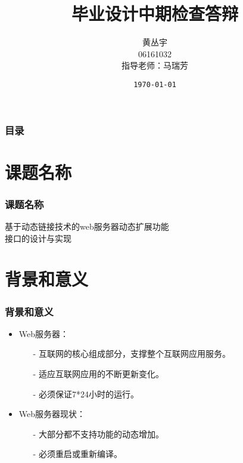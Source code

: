 \documentclass[dvipdfm]{beamer}
\begin{document}
\title[中期答辩]{\LARGE{毕业设计中期检查答辩\\}}
\author[黄丛宇]{黄丛宇\\06161032\\指导老师：马瑞芳}
\date{\texttt{\today}}

\begin{frame}	
	\titlepage
\end{frame}

\begin{frame}
	\frametitle{目录}
	\tableofcontents
\end{frame}

\section{课题名称}
\begin{frame}
	\frametitle{课题名称}
	
	\begin{center}
	{\Large
			基于动态链接技术的{\cp web}服务器动态扩展功能\\
				接口的设计与实现
	}
	\end{center}
\end{frame}

\section{背景和意义}
\begin{frame}
	\frametitle{背景和意义}
	\begin{itemize}
		\item {\cp Web}服务器：
			\begin{itemize}
				\item[-] 互联网的核心组成部分，支撑整个互联网应用服务。
				\item[-] 适应互联网应用的不断更新变化。
				\item[-] 必须保证7*24小时的运行。
			\end{itemize}
		\pause
		\item {\cp Web}服务器现状：
			\begin{itemize}
				\item[-] 大部分都不支持功能的动态增加。
				\item[-] 必须重启或重新编译。
			\end{itemize}
	\end{itemize}
\end{frame}
\end{document}
